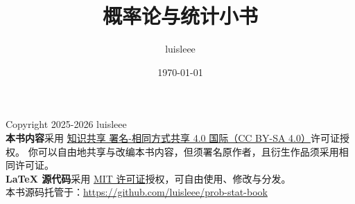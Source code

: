 \documentclass{article}
\title{概率论与统计小书}
\author{luisleee }
\date{\today}
\begin{document}
\maketitle

\thispagestyle{empty}
\vspace*{\fill}
\begin{small}
\noindent Copyright \textcopyright{} 2025-2026 luisleee\\[0.5em]
\noindent \textbf{本书内容}采用
\href{https://creativecommons.org/licenses/by-sa/4.0/deed.zh-hans}{知识共享 署名-相同方式共享 4.0 国际（CC BY-SA 4.0）}许可证授权。
你可以自由地共享与改编本书内容，但须署名原作者，且衍生作品须采用相同许可证。\\[0.5em]
\noindent \textbf{LaTeX 源代码}采用
\href{https://opensource.org/licenses/MIT}{MIT 许可证}授权，可自由使用、修改与分发。\\[0.5em]
\noindent 本书源码托管于：\url{https://github.com/luisleee/prob-stat-book}
\end{small}
\vspace*{\fill}
\newpage

\tableofcontents















\end{document}
